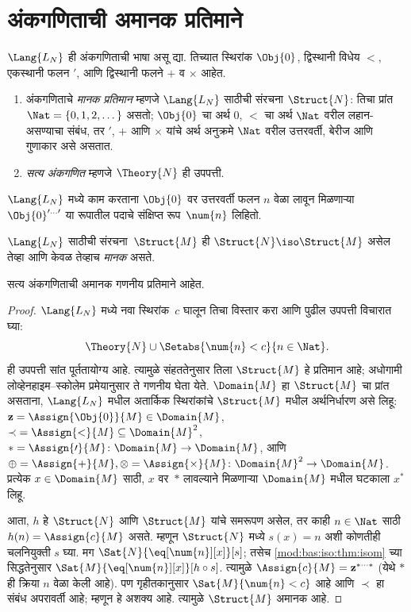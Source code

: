 \section{अंकगणिताची अमानक प्रतिमाने}\label{mod:bas:nsa:sec}

\begin{defn}
$\Lang{L_N}$ ही अंकगणिताची भाषा असू द्या. तिच्यात
स्थिरांक $\Obj{0}$, द्विस्थानी विधेय $<$,
एकस्थानी फलन $\prime$, आणि द्विस्थानी फलने
$+$ व $\times$ आहेत.
\begin{enumerate}
\item अंकगणिताचे \emph{मानक प्रतिमान} म्हणजे $\Lang{L_N}$ साठीची
  संरचना $\Struct{N}$: तिचा प्रांत $\Nat = \{ 0, 1, 2, \dots\}$
  असतो; $\Obj{0}$ चा अर्थ $0$, $<$ चा अर्थ $\Nat$ वरील लहान-असण्याचा
  संबंध, तर $\prime$, $+$ आणि $\times$ यांचे अर्थ अनुक्रमे
  $\Nat$ वरील उत्तरवर्ती, बेरीज आणि गुणाकार असे असतात.
\item \emph{सत्य अंकगणित} म्हणजे $\Theory{N}$ ही उपपत्ती.
\end{enumerate}
\end{defn}

$\Lang{L_N}$ मध्ये काम करताना $\Obj{0}$ वर उत्तरवर्ती फलन
$n$ वेळा लावून मिळणाऱ्या $\Obj{0}^{\prime\dots\prime}$
या रूपातील पदाचे संक्षिप्त रूप~$\num{n}$ लिहितो.

\begin{defn}
$\Lang{L_N}$ साठीची संरचना~$\Struct{M}$ ही
$\Struct{N} \iso \Struct{M}$ असेल तेव्हा आणि केवळ तेव्हाच
\emph{मानक} असते.
\end{defn}

\begin{thm}\label{mod:bas:nsa:thm:non-std}
सत्य अंकगणिताची अमानक गणनीय प्रतिमाने आहेत.
\end{thm}

\begin{proof}
$\Lang{L_N}$ मध्ये नवा स्थिरांक~$c$ घालून तिचा विस्तार करा
आणि पुढील उपपत्ती विचारात घ्या:
\[
\Theory{N} \cup \Setabs{\num{n} < c}{n \in \Nat}.
\]
ही उपपत्ती सांत पूर्ततायोग्य आहे. त्यामुळे संहततेनुसार तिला
$\Struct{M}$ हे प्रतिमान आहे; अधोगामी लोव्हेनहाइम--स्कोलेम
प्रमेयानुसार ते गणनीय घेता येते. $\Domain{M}$ हा
$\Struct{M}$ चा प्रांत असताना, $\Lang{L_N}$ मधील अतार्किक
स्थिरांकांचे $\Struct{M}$ मधील अर्थनिर्धारण असे लिहू:
$\mathbf{z} = \Assign{\Obj{0}}{M} \in \Domain{M}$,
${\prec} = \Assign{<}{M} \subseteq \Domain{M}^2$,
$* = \Assign{\prime}{M} \colon \Domain{M} \to \Domain{M}$,
आणि $\oplus = \Assign{+}{M}, \otimes =
\Assign{\times}{M} \colon \Domain{M}^2 \to \Domain{M}$.
प्रत्येक $x \in \Domain{M}$ साठी, $x$ वर~$*$ लावल्याने
मिळणाऱ्या $\Domain{M}$ मधील घटकाला $x^*$ लिहू.


आता, $h$ हे $\Struct{N}$ आणि $\Struct{M}$ यांचे
समरूपण असेल, तर काही $n \in \Nat$ साठी
$h(n) = \Assign{c}{M}$ असते. म्हणून $\Struct{N}$ मध्ये
$s(x) = n$ अशी कोणतीही चलनियुक्ती $s$ घ्या. मग
$\Sat{N}{\eq[\num{n}][x]}[s]$; तसेच
\ref{mod:bas:iso:thm:isom} च्या सिद्धतेनुसार
$\Sat{M}{\eq[\num{n}][x]}[h \circ s]$.
त्यामुळे $\Assign{c}{M} = \mathbf{z}^{*\cdots *}$
(येथे $*$ ही क्रिया $n$ वेळा केली आहे).
पण गृहीतकानुसार $\Sat{M}{\num{n} < c}$ आहे आणि
$\prec$ हा संबंध अपरावर्ती आहे; म्हणून हे अशक्य आहे.
त्यामुळे $\Struct{M}$ अमानक आहे.
\end{proof}

